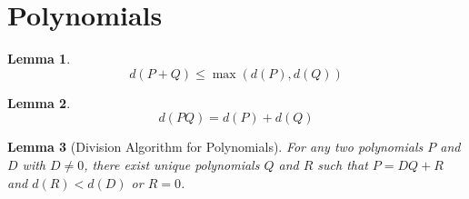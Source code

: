 \documentclass{book}
\newtheorem{lm}{Lemma}[chapter]
\theoremstyle{definition}
\begin{document}
  \section{Polynomials}
  
  \begin{lm}
    \[ d(P + Q) \leq \max(d(P), d(Q)) \]
  \end{lm}
  
  \begin{lm}
    \[ d(PQ) = d(P) + d(Q) \]
  \end{lm}
  
  \begin{lm}[Division Algorithm for Polynomials]
    For any two polynomials $P$ and $D$ with $D \neq 0$, there exist unique 
    polynomials $Q$ and $R$ such that $P = DQ + R$ and $d(R) < d(D)$ or $R = 0$.
  \end{lm}
  
\end{document}
